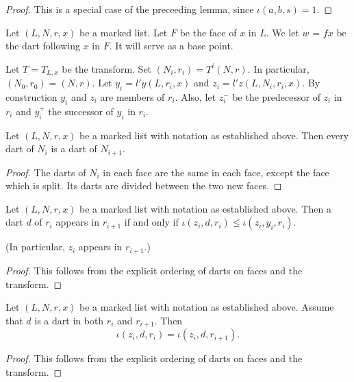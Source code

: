 \begin{proof} This is a special case of the preceeding lemma, since $\iota(a,b,s)=1$.
\end{proof}


\begin{remark}[F,~T,~w,~$N_i$,~$r_i$,~$y_i$,~$z_i$]
Let $(L,N,r,x)$ be a marked list.  Let $F$ be the face of $x$ in $L$.
 We let $w$ = $f x$ be the dart following $x$ in $F$.  It will serve
as a base point.

Let $T = T_{L,x}$ be the transform.  Set $(N_i,r_i) = T^i (N,r)$.  In particular,
$(N_0,r_0) = (N,r)$.   Let $y_i = l'y(L,r_i,x)$ and $z_i = l'z (L,N_i,r_i,x)$.
By construction $y_i$ and $z_i$ are members of $r_i$.
Also, let $z_i^-$ be the predecessor of $z_i$ in $r_i$ and $y_i^+$ the successor of
$y_i$ in $r_i$.
\end{remark}

\begin{lemma}
  Let $(L,N,r,x)$ be a marked list with notation as established above.
Then every dart of $N_i$ is a dart of $N_{i+1}$.
\end{lemma}

\begin{proof} The darts of $N_i$ in each face are the same in each face, except the face which is split.
Its darts are divided between the two new faces.
\end{proof}

\begin{lemma} 
Let $(L,N,r,x)$ be a marked list with notation as established above.
Then a dart $d$ of $r_i$ appears in $r_{i+1}$ if and only if $\iota(z_i,d,r_i)\le \iota(z_i,y_i,r_i)$.
\end{lemma}

(In particular, $z_i$ appears in $r_{i+1}$.)

\begin{proof} This follows from the explicit ordering of darts on faces and the transform.
\end{proof}


\begin{lemma}
Let $(L,N,r,x)$ be a marked list with notation as established above.
Assume that $d$ is a dart in both $r_i$ and $r_{i+1}$.  Then 
\[
\iota(z_i,d,r_i) = \iota(z_i,d,r_{i+1}).
\]
\end{lemma}

\begin{proof} This follows from the explicit ordering of darts on faces and the transform.
\end{proof}

